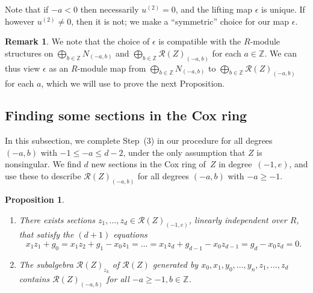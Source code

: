 \documentclass[a4paper,11pt]{amsart}
\theoremstyle{plain}
\newtheorem{proposition}[theorem]{Proposition}
\theoremstyle{definition}
\newtheorem{remark}[theorem]{Remark}
\newcommand{\R}{\mathcal{R}}
\newcommand{\Z}{\mathbb{Z}}
\begin{document}
Note that if $-a<0$ then necessarily $u^{(2)}=0$, and the lifting map $\epsilon$ is unique. If however $u^{(2)}\neq 0$, then 
it is not; we make a ``symmetric'' choice for our map $\epsilon$. 
\begin{remark}
    We note that the choice of $\epsilon$ is compatible with the $R$-module structures on $\bigoplus_{b\in \Z} N_{(-a,b)}$ and $\bigoplus_{b \in \Z} \R(Z)_{(-a,b)}$ for each $a \in \Z$. We can thus view $\epsilon$ as an $R$-module map from $\bigoplus_{b\in \Z} N_{(-a,b)}$ to $\bigoplus_{b \in \Z} \R(Z)_{(-a,b)}$ for each $a$, which we will use to prove the next Proposition.
\end{remark}

\subsection{Finding some sections in the Cox ring}
In this subsection, we complete Step~(3) in our procedure for all degrees $(-a,b)$ with $-1 \leq -a \leq d-2$, under the only assumption that $Z$ is nonsingular. We find $d$ new sections in the Cox ring of~$Z$ in degree~$(-1,e)$, and use these to describe $\R(Z)_{(-a,b)}$ for all degrees $(-a,b)$ with $-a \geq -1$.  

\begin{proposition}\label{prop:z_k}
\begin{enumerate} \item[(i)] There exists sections $z_1, \dots, z_d \in \R(Z)_{(-1,e)}$, linearly independent over $R$, that satisfy the $(d+1)$ equations
\begin{equation}
    x_1 z_1 + g_0 = x_1 z_{2} + g_{1} - x_0 z_{1} = \dots = x_1 z_{d} + g_{d-1} - x_0 z_{d-1} = g_d - x_0 z_d = 0.
    \label{eq:coxz}
\end{equation}
\item[(ii)]The subalgebra $\R(Z)_{z_k}$ of $\R(Z)$ generated by $x_0, x_1, y_0, \dots, y_n, z_1, \dots, z_d$ contains $\R(Z)_{(-a,b)}$ for all $-a \geqslant -1, b \in \Z$.\end{enumerate}
\label{prop:coxz1}
\end{proposition}
\end{document}
